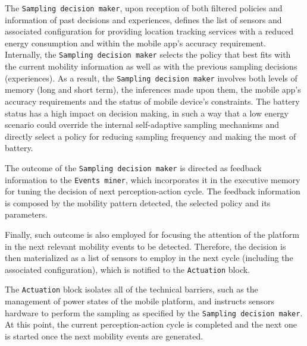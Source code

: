 \documentclass[ENG,PhD]{cinvestav}
\begin{document}
The \texttt{Sampling decision maker}, upon reception of both filtered policies and information of past decisions and experiences, defines the list of sensors and associated configuration for providing location tracking services with a reduced energy consumption and within the mobile app's accuracy requirement.
Internally, the \texttt{Sampling decision maker} selects the policy that best fits with the current mobility information as well as with the previous sampling decisions (experiences).
As a result, the \texttt{Sampling decision maker} involves both levels of memory (long and short term), the inferences made upon them, the mobile app's accuracy requirements and the status of mobile device's constraints.
The battery status has a high impact on decision making, in such a way that a low energy scenario could override the internal self-adaptive sampling mechanisms and directly select a policy for reducing sampling frequency and making the most of battery.

The outcome of the \texttt{Sampling decision maker} is directed as feedback information to the \texttt{Events miner}, which incorporates it in the executive memory for tuning the decision of next perception-action cycle.
The feedback information is composed by the mobility pattern detected, the selected policy and its parameters.

Finally, such outcome is also employed for focusing the attention of the platform in the next relevant mobility events to be detected.
Therefore, the decision is then materialized as a list of sensors to employ in the next cycle (including the associated configuration), which is notified to the \texttt{Actuation} block.

The \texttt{Actuation} block isolates all of the technical barriers, such as the management of power states of the mobile platform, and instructs sensors hardware to perform the sampling as specified by the \texttt{Sampling decision maker}.
At this point, the current perception-action cycle is completed and the next one is started once the next mobility events are generated.
\end{document}
